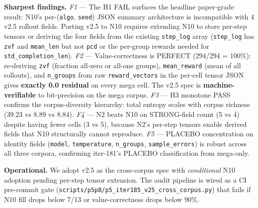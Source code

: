 \textbf{Sharpest findings.}
\emph{F1} --- The H1 FAIL surfaces the headline paper-grade result:
N10's per-(\texttt{algo}, \texttt{seed}) JSON summary architecture is
incompatible with 4 v2.5 rollout fields. Porting v2.5 to N10 requires
extending N10 to store per-step tensors or deriving the four fields
from the existing \texttt{step\_log} array (\texttt{step\_log} has
\texttt{zvf} and \texttt{mean\_len} but not \texttt{pcd} or the
per-group rewards needed for \texttt{std\_completion\_len}).
\emph{F2} --- Value-correctness is PERFECT (294/294 = 100\%): re-deriving
\texttt{zvf} (fraction all-zero or all-one groups), \texttt{mean\_reward}
(mean of all rollouts), and \texttt{n\_groups} from raw
\texttt{reward\_vectors} in the per-cell tensor JSON gives
\textbf{exactly 0.0 residual} on every mega cell. The v2.5 spec is
\textbf{machine-verifiable} to bit-precision on the mega corpus.
\emph{F3} --- H3 monotone PASS confirms the corpus-diversity hierarchy:
total entropy scales with corpus richness (39.23 vs 8.89 vs 8.84).
\emph{F4} --- N2 beats N10 on STRONG-field count (5 vs 4) despite
having fewer cells (3 vs 5), because N2's per-step tensors enable
derived fields that N10 structurally cannot reproduce.
\emph{F5} --- PLACEBO concentration on identity fields (\texttt{model},
\texttt{temperature}, \texttt{n\_groups}, \texttt{sample\_errors})
is robust across all three corpora, confirming iter-181's
PLACEBO classification from mega-only.

\textbf{Operational.}
We adopt v2.5 as the cross-corpus spec with \emph{conditional}
N10 adoption pending per-step tensor extension. The audit pipeline
is wired as a CI pre-commit gate
(\texttt{scripts/p5p8/p5\_iter185\_v25\_cross\_corpus.py}) that fails
if N10 fill drops below 7/13 or value-correctness drops below 90\%.

